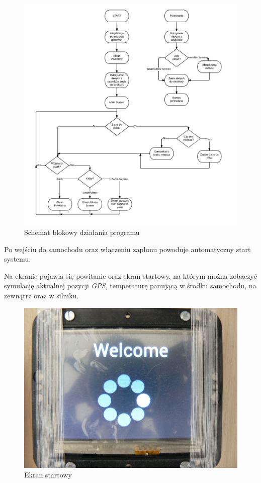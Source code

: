 \documentclass{xmgr}
\begin{document}
\begin{figure}[!hp]
    \centering
    	\includegraphics[height=0.65\textheight]{images/codeDiagram.png}
    \caption{Schemat blokowy działania programu}
\end{figure}

Po wejściu do samochodu oraz włączeniu zapłonu powoduje automatyczny start systemu. 

Na ekranie pojawia się powitanie oraz ekran startowy, na którym można zobaczyć symulację aktualnej pozycji \emph{GPS}, temperaturę panującą w środku samochodu, na zewnątrz oraz w silniku. 

\begin{figure}[!h]
    \centering
    	\includegraphics[height=0.3\textheight]{images/start.JPG}
    \caption{Ekran startowy}
\end{figure} 
\end{document}
